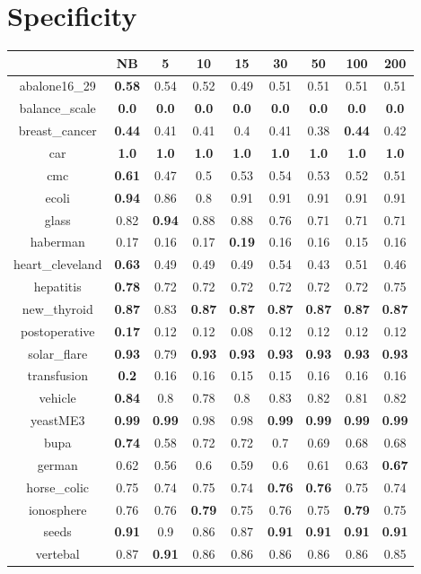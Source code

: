 \documentclass{article}%
\begin{document}
%
\section*{Specificity}%
\begin{tabular}{c|cccccccc}%
\hline%
&NB&5&10&15&30&50&100&200\\%
\hline%
abalone16\_29&\textbf{0.58}&0.54&0.52&0.49&0.51&0.51&0.51&0.51\\%
\hline%
balance\_scale&\textbf{0.0}&\textbf{0.0}&\textbf{0.0}&\textbf{0.0}&\textbf{0.0}&\textbf{0.0}&\textbf{0.0}&\textbf{0.0}\\%
\hline%
breast\_cancer&\textbf{0.44}&0.41&0.41&0.4&0.41&0.38&\textbf{0.44}&0.42\\%
\hline%
car&\textbf{1.0}&\textbf{1.0}&\textbf{1.0}&\textbf{1.0}&\textbf{1.0}&\textbf{1.0}&\textbf{1.0}&\textbf{1.0}\\%
\hline%
cmc&\textbf{0.61}&0.47&0.5&0.53&0.54&0.53&0.52&0.51\\%
\hline%
ecoli&\textbf{0.94}&0.86&0.8&0.91&0.91&0.91&0.91&0.91\\%
\hline%
glass&0.82&\textbf{0.94}&0.88&0.88&0.76&0.71&0.71&0.71\\%
\hline%
haberman&0.17&0.16&0.17&\textbf{0.19}&0.16&0.16&0.15&0.16\\%
\hline%
heart\_cleveland&\textbf{0.63}&0.49&0.49&0.49&0.54&0.43&0.51&0.46\\%
\hline%
hepatitis&\textbf{0.78}&0.72&0.72&0.72&0.72&0.72&0.72&0.75\\%
\hline%
new\_thyroid&\textbf{0.87}&0.83&\textbf{0.87}&\textbf{0.87}&\textbf{0.87}&\textbf{0.87}&\textbf{0.87}&\textbf{0.87}\\%
\hline%
postoperative&\textbf{0.17}&0.12&0.12&0.08&0.12&0.12&0.12&0.12\\%
\hline%
solar\_flare&\textbf{0.93}&0.79&\textbf{0.93}&\textbf{0.93}&\textbf{0.93}&\textbf{0.93}&\textbf{0.93}&\textbf{0.93}\\%
\hline%
transfusion&\textbf{0.2}&0.16&0.16&0.15&0.15&0.16&0.16&0.16\\%
\hline%
vehicle&\textbf{0.84}&0.8&0.78&0.8&0.83&0.82&0.81&0.82\\%
\hline%
yeastME3&\textbf{0.99}&\textbf{0.99}&0.98&0.98&\textbf{0.99}&\textbf{0.99}&\textbf{0.99}&\textbf{0.99}\\%
\hline%
bupa&\textbf{0.74}&0.58&0.72&0.72&0.7&0.69&0.68&0.68\\%
\hline%
german&0.62&0.56&0.6&0.59&0.6&0.61&0.63&\textbf{0.67}\\%
\hline%
horse\_colic&0.75&0.74&0.75&0.74&\textbf{0.76}&\textbf{0.76}&0.75&0.74\\%
\hline%
ionosphere&0.76&0.76&\textbf{0.79}&0.75&0.76&0.75&\textbf{0.79}&0.75\\%
\hline%
seeds&\textbf{0.91}&0.9&0.86&0.87&\textbf{0.91}&\textbf{0.91}&\textbf{0.91}&\textbf{0.91}\\%
\hline%
vertebal&0.87&\textbf{0.91}&0.86&0.86&0.86&0.86&0.86&0.85\\%
\hline%
\end{tabular}
\end{document}
